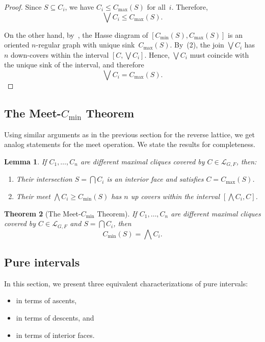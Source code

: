 \documentclass[12pt, reqno]{amsart}
\theoremstyle{plain}
\newtheorem{theorem}{Theorem}[section]
\newtheorem{lemma}[theorem]{Lemma}
\theoremstyle{definition}
\numberwithin{equation}{section}
\newcommand\scrL{\mathscr{L}}
\begin{document}
\begin{proof}
    Since $S\subseteq C_i$, we have $C_i\leq C_{\max}(S)$ for all~$i$. Therefore,
    \[
    \bigvee C_i \leq C_{\max}(S).
    \]
    
    On the other hand, by~, the Hasse diagram of $[C_{\min}(S),C_{\max}(S)]$ is an oriented $n$-regular graph with unique sink~$C_{\max}(S)$. By~(2), the join $\bigvee C_i$ has $n$ down-covers within the interval $[C,\bigvee C_i]$. Hence, $\bigvee C_i$ must coincide with the unique sink of the interval, and therefore
    \[
    \bigvee C_i = C_{\max}(S).
    \]
\end{proof}

\subsection{The Meet-\texorpdfstring{$C_{\min}$}{Cmin}  Theorem}

Using similar arguments as in the previous section for the reverse lattice, we get analog statements for the meet operation. We state the results for completeness.

\begin{lemma}\label{lem_meet_nupcovers}
    If $C_1,\dots , C_n$ are different maximal cliques covered by $C\in \scrL_{G,F}$, then:
    \begin{enumerate}
        \item Their intersection $S=\bigcap C_i$ is an interior face and satisfies $C=C_{\max}(S)$.
        \item Their meet $\bigwedge C_i\geq C_{\min}(S)$ has $n$ up covers within the interval $[\bigwedge C_i,C]$.
    \end{enumerate}
\end{lemma}

\begin{theorem}[The Meet-$C_{\min}$ Theorem]\label{thm_meet_min}
    If $C_1,\dots , C_n$ are different maximal cliques covered by $C\in \scrL_{G,F}$ and $S=\bigcap C_i$, then
    \[
    C_{\min}(S) = \bigwedge C_i.
    \]
\end{theorem}



\subsection{Pure intervals}\label{subsec_pure_intervals}
In this section, we present three equivalent characterizations of pure intervals:
\begin{itemize}
\item in terms of ascents,
\item in terms of descents, and
\item in terms of interior faces.
\end{itemize}
\end{document}
